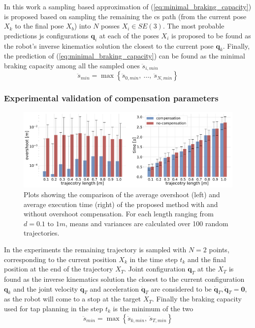 In this work a sampling based approximation of (\ref{eq:minimal_braking_capacity}) is proposed based on sampling the remaining the \gls{cs} path (from the current pose $X_k$ to the final pose $X_b$) into $N$ posses $X_i\in SE(3)$. The most probable predictions \gls{js} configurations $\bm{q}_i$ at each of the poses $X_i$ is proposed to be found as the robot's inverse kinematics solution the closest to the current pose $\bm{q}_k$. Finally, the prediction of (\ref{eq:minimal_braking_capacity}) can be found as the minimal braking capacity among all the sampled ones $\ddot{s}_{i, min}$
\begin{equation}
    \ddot{s}_{min} = \max \left\{\ddot{s}_{0, min},~ \ldots,~ \ddot{s}_{N, min}\right \}
\end{equation}



\subsubsection*{Experimental validation of compensation parameters} 
\begin{figure}[!h]
    \centering
    \includegraphics[width=\linewidth]{Papers/imgs/compensation_comp.pdf}
    \caption{Plots showing the comparison of the average overshoot (left) and average execution time (right) of the proposed method with and without overshoot compensation. For each length ranging from $d=0.1$ to $1m$, means and variances are calculated over 100 random trajectories. }
    \label{fig:compensatiopn_comp}
\end{figure}
In the experiments the remaining trajectory is sampled with $N=2$ points, corresponding to the current position $X_k$ in the time step $t_k$ and the final position at the end of the trajectory $X_T$. Joint configuration $\bm{q}_T$ at the $X_T$ is found as the inverse kinematics solution the closest to the current configuration $\bm{q}_k$ and the joint velocity $\dot{\bm{q}}_T$ and acceleration $\ddot{\bm{q}}_T$ are considered to be $\dot{\bm{q}}_T,\ddot{\bm{q}}_T= \bm{0}$, as the robot will come to a stop at the target $X_T$. Finally the braking capacity used for \gls{tap} planning in the step $t_k$ is the minimum of the two
\begin{equation}
    \ddot{s}_{min} = \max\left\{\ddot{s}_{k,min},~ \ddot{s}_{T,min}\right\}
\end{equation}

